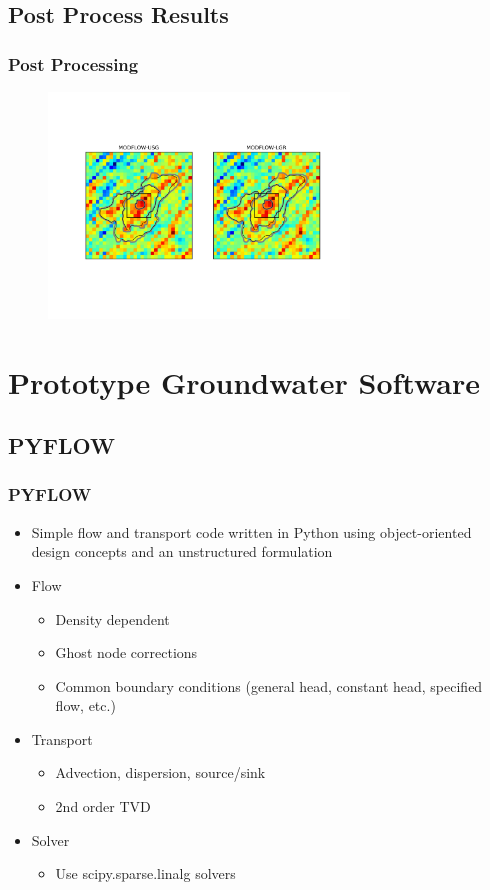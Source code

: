 \documentclass[t]{beamer}
\begin{document}
\subsection{Post Process Results}
\begin{frame}[fragile]
\frametitle{Post Processing}
  \begin{figure}[ht]
  \centering
         \includegraphics[height=6cm]{figures/lgr-usg.png}
   \end{figure}
\end{frame}


\section{Prototype Groundwater Software}
\subsection{PYFLOW}

\begin{frame}[fragile]
\frametitle{PYFLOW}
   \begin{itemize}
      \item{Simple flow and transport code written in Python using object-oriented design concepts and an unstructured formulation}
      \item{Flow}
         \begin{itemize}
            \item{Density dependent}
            \item{Ghost node corrections}
            \item{Common boundary conditions (general head, constant head, specified flow, etc.)}
         \end{itemize}
      \item{Transport}
         \begin{itemize}
            \item{Advection, dispersion, source/sink}
            \item{2nd order TVD}
         \end{itemize}
      \item{Solver}
         \begin{itemize}
            \item{Use scipy.sparse.linalg solvers}
         \end{itemize}
   \end{itemize}
\end{frame}
\end{document}
